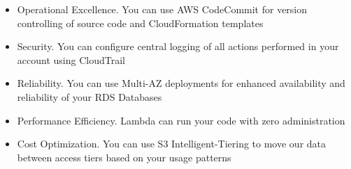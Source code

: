 \documentclass{article}%
\begin{document}
\begin{itemize}
    \item Operational Excellence. You can use AWS CodeCommit for version controlling of source code and CloudFormation templates
    \item Security. You can configure central logging of all actions performed in your account using CloudTrail
    \item Reliability. You can use Multi-AZ deployments for enhanced availability and reliability of your RDS Databases
    \item Performance Efficiency. Lambda can run your code with zero administration
    \item Cost Optimization. You can use S3 Intelligent-Tiering to move our data between access tiers based on your usage patterns
\end{itemize}
    
\end{document}
